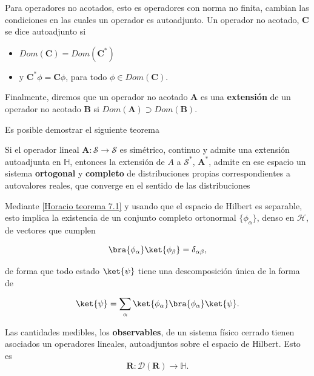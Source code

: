 Para operadores no acotados, esto es operadores con norma no finita, cambian las condiciones en las cuales un operador es autoadjunto. Un operador no acotado, $\mathbf{C}$ se dice autoadjunto si

\begin{itemize}
    \item $Dom (\mathbf{C}) = Dom (\mathbf{C}^{*})$ 
    \item y $\mathbf{C}^{*}\phi = \mathbf{C}\phi$, para todo $\phi \in Dom (\mathbf{C}) $.
\end{itemize}

Finalmente, diremos que un operador no acotado $\mathbf{A}$ es una \textbf{extensión} de un operador no acotado $\mathbf{B}$ si $Dom(\mathbf{A}) \supset Dom(\mathbf{B})$.

Es posible demostrar el siguiente teorema \cite[p.~230]{HoracioI}
\begin{theorem}
Si el operador lineal $\mathbf{A}: \mathcal{S} \rightarrow \mathcal{S}$ es simétrico, continuo y admite una extensión autoadjunta en $\mathbb{H}$, entonces la extensión de $A$ a $\mathcal{S}^{*}$, $\mathbf{A}^{*}$, admite en ese espacio un sistema \textbf{ortogonal} y \textbf{completo} de distribuciones propias correspondientes a autovalores reales, que converge en el sentido de las distribuciones 
\label{Horacio teorema 7.1}
\end{theorem}

Mediante \ref{Horacio teorema 7.1} y usando que el espacio de Hilbert es separable, esto implica la existencia de un conjunto completo ortonormal $\{\phi_{\alpha}\}$, denso en $\mathcal{H}$, de vectores que cumplen 

\begin{equation}
    \bra{\phi_{\alpha}} \ket{\phi_{\beta}} = \delta_{\alpha \beta},
\end{equation}

de forma que todo estado $\ket{\psi}$ tiene una descomposición única de la forma de 

\begin{equation}
    \ket{\psi} = \sum_{\alpha} \ket{\phi_{\alpha}} \bra{\phi_{\alpha}} \ket{\psi}.
\end{equation}
 
Las cantidades medibles, los \textbf{observables}, de un sistema físico cerrado tienen asociados un operadores lineales, autoadjuntos sobre el espacio de Hilbert. Esto es
\begin{equation}
    \mathbf{R} : \mathcal{D}(\mathbf{R}) \rightarrow \mathds{H}.
\end{equation}
  
